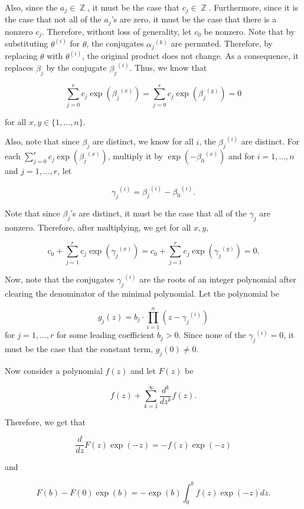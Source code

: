 \documentclass[a4paper, 11pt]{book}
\DeclareMathOperator{\Z}{\mathbb{Z}}
\begin{document}
{    Also, since the $a_j \in \Z$, it must be the case that $c_j \in \Z$. Furthermore, since it is the case that not all of the $a_j$'s are zero, it must be the case that there is a nonzero $c_j$. Therefore, without loss of generality, let $c_0$ be nonzero. Note that by substituting $\theta^{(i)}$ for $\theta$, the conjugates ${\alpha_j}^{(k)}$ are permuted. Therefore, by replacing $\theta$ with $\theta^{(i)}$, the original product does not change. As a consequence, it replaces $\beta_j$ by the conjugate ${\beta_j}^{(i)}$. Thus, we know that 

    \[\sum\limits_{j=0}^{r}c_j \exp({\beta_j}^{(x)}) = \sum\limits_{j=0}^{r}c_j \exp({\beta_j}^{(y)}) = 0\]

    for all $x, y \in \{1, \ldots, n\}$.\par 

    Also, note that since $\beta_j$ are distinct, we know for all $i$, the ${\beta_{j}}^{(i)}$ are distinct. For each $\sum\limits_{j=0}^{r}c_j \exp({\beta_j}^{(x)})$, multiply it by $\exp(-{\beta_0}^{(x)})$ and for $i = 1, \ldots, n$ and $j = 1, \ldots, r$, let 

    \[{\gamma_j}^{(i)} = {\beta_j}^{(i)} - {\beta_0}^{(i)}.\]

    Note that since $\beta_j$'s are distinct, it must be the case that all of the $\gamma_j$ are nonzero. Therefore, after multiplying, we get for all $x, y$,

    \[c_0 + \sum\limits_{j=1}^{r} c_j\exp({\gamma_j}^{(x)}) = c_0 + \sum\limits_{j=1}^{r} c_j\exp({\gamma_j}^{(y)}) = 0.\]

    Now, note that the conjugates ${\gamma_j}^{(i)}$ are the roots of an integer polynomial after clearing the denominator of the minimal polynomial. Let the polynomial be 

    \[g_j(z) = b_j \cdot \prod\limits_{i=1}^{n} \left(z - {\gamma_j}^{(i)}\right)\] for $j = 1,\ldots, r$ for some leading coefficient $b_j > 0$. Since none of the ${\gamma_j}^{(i)} = 0$, it must be the case that the constant term, $g_j(0) \neq 0$.\par

    Now consider a polynomial $f(z)$ and let $F(z)$ be 

    \[f(z) + \sum\limits_{k=1}^{\infty} \frac{d^k}{dz^k}f(z).\]

    Therefore, we get that 

    \[\frac{d}{dz} F(z) \exp(-z) = -f(z) \exp(-z)\]

    and 

    \[F(b) - F(0)\exp(b) = -\exp(b) \int_{0}^{b}f(z)\exp(-z) dz.\]

}
\end{document}

